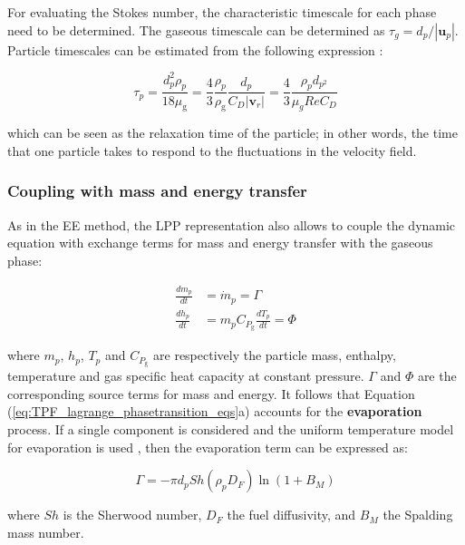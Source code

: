 For evaluating the Stokes number, the characteristic timescale for each phase need to be determined. The gaseous timescale can be determined as $\tau_g = d_p / | \textbf{u}_p |$. Particle timescales can be estimated from the following expression :

\begin{equation}
\tau_p = \frac{d_p^2 \rho_p}{18 \mu_\mathrm{g}} =  \frac{4}{3} \frac{\rho_p}{\rho_\mathrm{g}} \frac{d_p}{C_D | \boldsymbol{v}_r |} = \frac{4}{3} \frac{\rho_p d_{p^2}}{\mu_g Re C_D}
\end{equation}

which can be seen as the relaxation time of the particle; in other words, the time that one particle takes to respond to the fluctuations in the velocity field.


\subsubsection*{Coupling with mass and energy transfer}

As in the EE method, the LPP representation also allows to couple the dynamic equation with exchange terms for mass and energy transfer with the gaseous phase:

\begin{subequations}
\label{eq:TPF_lagrange_phasetransition_eqs}
\begin{align}
\frac{d m_p}{d t} &= \dot{m}_p = \Gamma \\
\frac{d h_p}{d t} &= m_p C_{P_\mathrm{g}} \frac{d T_p}{d t} = \Phi
\end{align}
\end{subequations}

where $m_p$, $h_p$, $T_p$ and $C_{P_\mathrm{g}}$ are respectively the particle mass, enthalpy, temperature and gas specific heat capacity at constant pressure. $\Gamma$ and $\Phi$ are the corresponding source terms for mass and energy. It follows that Equation (\ref{eq:TPF_lagrange_phasetransition_eqs}a) accounts for the \textbf{evaporation} process. If a single component is considered and the uniform temperature model for evaporation is used , then the evaporation term can be expressed as:

\begin{equation}
\Gamma = - \pi d_p Sh \left( \rho_p D_F \right) \ln \left( 1 + B_M \right)
\end{equation}

where $Sh$ is the Sherwood number, $D_F$ the fuel diffusivity, and $B_M$ the Spalding mass number. \\

